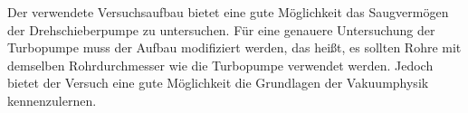 Der verwendete Versuchsaufbau bietet eine gute Möglichkeit das Saugvermögen der Drehschieberpumpe zu untersuchen.
Für eine genauere Untersuchung der Turbopumpe muss der Aufbau modifiziert werden, das heißt, es sollten Rohre mit
demselben Rohrdurchmesser wie die Turbopumpe verwendet werden.
Jedoch bietet der Versuch eine gute Möglichkeit die Grundlagen der Vakuumphysik kennenzulernen. 

